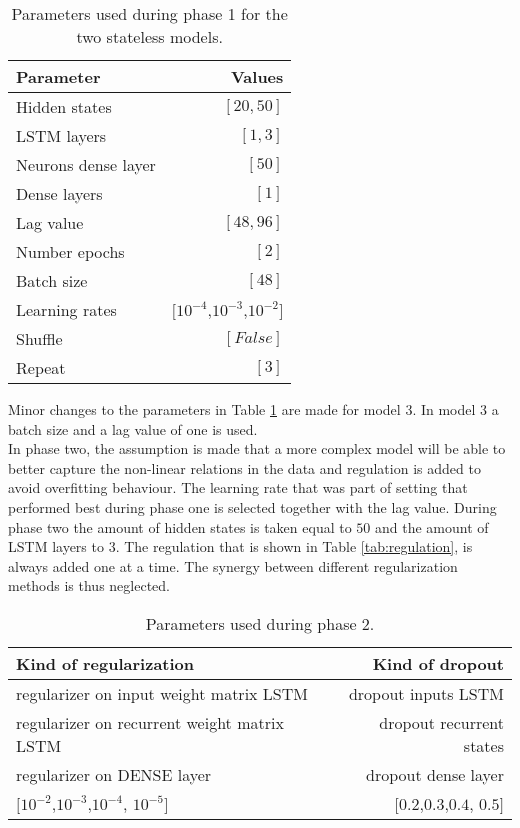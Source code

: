 \begin{table}[ht]
	\centering
	\begin{tabular}{@{}l|r@{}} \toprule
		\textbf{Parameter}	& \textbf{Values}\\\midrule
		Hidden states &  $ [20,50] $\\
		LSTM layers & $ [1,3] $\\
		Neurons dense layer & $ [50] $\\
		Dense layers & $ [1] $\\
		Lag value & $ [48,96] $\\
		Number epochs & $ [2] $\\
		Batch size & $ [48] $\\
		Learning rates & $[ 10^{-4} $,$ 10^{-3} $,$ 10^{-2} ]$\\
		Shuffle & $ [False] $\\
		Repeat & $ [3] $\\\bottomrule
	\end{tabular}
	\caption{Parameters used during phase 1 for the two stateless models.}
	\label{tab:para_phase1}
\end{table}

Minor changes to the parameters in Table \ref{tab:para_phase1} are made for model 3. In model 3 a batch size and a lag value of one is used.\\

In phase two, the assumption is made that a more complex model will be able to better capture the non-linear relations in the data and regulation is added to avoid overfitting behaviour. The learning rate that was part of setting that performed best during phase one is selected together with the lag value. During phase two the amount of hidden states is taken equal to $ 50 $ and the amount of LSTM layers to $ 3 $. The regulation that is shown in Table \ref{tab:regulation}, is always added one at a time. The synergy between different regularization methods is thus neglected. 

\begin{table}[ht]
	\centering
	\begin{tabular}{@{}l|r@{}} \toprule
		\textbf{Kind of regularization} & 	\textbf{Kind of dropout}\\\hline
		regularizer on input weight matrix LSTM 	& dropout inputs LSTM\\\hline
		regularizer on recurrent weight matrix LSTM & dropout recurrent states\\\hline
		regularizer on DENSE layer & dropout dense layer\\\hline
		$[ 10^{-2} $,$ 10^{-3} $,$ 10^{-4}$, $ 10^{-5} ]$ & $[ 0.2 $,$ 0.3 $,$ 0.4$, $ 0.5 ]$\\\bottomrule
\end{tabular}
\caption{Parameters used during phase 2.}
\label{tab:para_phase2}
\end{table}



